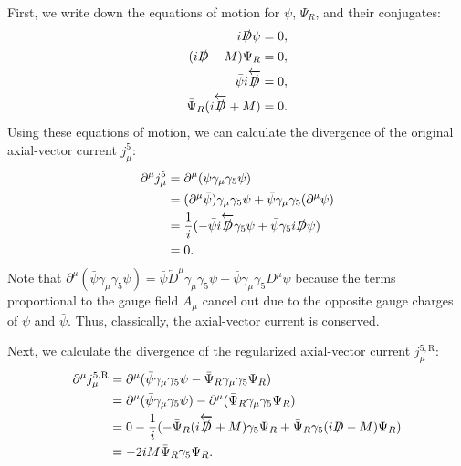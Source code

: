 \answer{}
First, we write down the equations of motion for $\psi$, $\Psi_R$, and their conjugates:
\begin{align}
i\slashed{D}\psi &= 0, \\
(i\slashed{D} - M)\Psi_R &= 0, \\
\bar{\psi}i\overleftarrow{\slashed{D}} &= 0, \\
\bar{\Psi}_R(i\overleftarrow{\slashed{D}} + M) &= 0.
\end{align}
Using these equations of motion, we can calculate the divergence of the original axial-vector current $j_\mu^5$:
\begin{align}
\partial^\mu j_\mu^5 &= \partial^\mu (\bar{\psi}\gamma_\mu\gamma_5\psi) \\
&= (\partial^\mu \bar{\psi})\gamma_\mu\gamma_5\psi + \bar{\psi}\gamma_\mu\gamma_5(\partial^\mu \psi) \\
&= \frac{1}{i}(-\bar{\psi}i\overleftarrow{\slashed{D}}\gamma_5\psi + \bar{\psi}\gamma_5 i\slashed{D}\psi) \\
&= 0.
\end{align}
Note that $\partial^\mu (\bar{\psi} \gamma_\mu \gamma_5 \psi) = \bar{\psi} \overleftarrow{D}^\mu \gamma_\mu \gamma_5 \psi + \bar{\psi} \gamma_\mu \gamma_5 D^\mu \psi$ because the terms proportional to the gauge field $A_\mu$ cancel out due to the opposite gauge charges of $\psi$ and $\bar{\psi}$. Thus, classically, the axial-vector current is conserved. 

Next, we calculate the divergence of the regularized axial-vector current $j_\mu^{5,\text{R}}$:
\begin{align}
\partial^\mu j_\mu^{5,\text{R}} &= \partial^\mu (\bar{\psi}\gamma_\mu\gamma_5\psi - \bar{\Psi}_R\gamma_\mu\gamma_5\Psi_R) \\
&= \partial^\mu (\bar{\psi}\gamma_\mu\gamma_5\psi) - \partial^\mu (\bar{\Psi}_R\gamma_\mu\gamma_5\Psi_R) \\
&= 0 - \frac{1}{i}(-\bar{\Psi}_R(i\overleftarrow{\slashed{D}} + M)\gamma_5\Psi_R + \bar{\Psi}_R\gamma_5 (i\slashed{D} - M)\Psi_R) \\
&= -2iM \bar{\Psi}_R \gamma_5 \Psi_R. 
\end{align}


